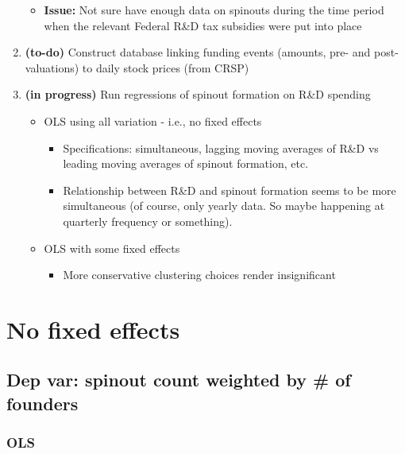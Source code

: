 \documentclass[12pt,english]{article}
\theoremstyle{remark}
\begin{document}
\begin{enumerate}
\begin{itemize}
		\item \textbf{Issue: } Not sure have enough data on spinouts during the time period when the relevant Federal R\&D tax subsidies were put into place
	\end{itemize}
	\item \textbf{(to-do)} Construct database linking funding events (amounts, pre- and post- valuations) to daily stock prices (from CRSP)
	\item \textbf{(in progress)} Run regressions of spinout formation on R\&D spending
	\begin{itemize}
		\item OLS using all variation - i.e., no fixed effects
		\begin{itemize}
			\item Specifications: simultaneous, lagging moving averages of R\&D vs leading moving averages of spinout formation, etc.
			\item Relationship between R\&D and spinout formation seems to be more simultaneous (of course, only yearly data. So maybe happening at quarterly frequency or something).
		\end{itemize}
		\item OLS with some fixed effects
		\begin{itemize}
			\item More conservative clustering choices render insignificant
		\end{itemize}
	\end{itemize}
\end{enumerate}


\section{No fixed effects}

\subsection{Dep var: spinout count weighted by \# of founders}

\subsubsection{OLS}

\linebreak

\linebreak

\linebreak

\linebreak

\linebreak

\linebreak

\linebreak

\linebreak

\linebreak

\end{document}
